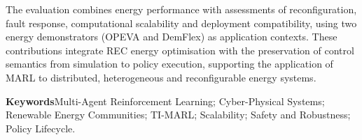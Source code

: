 The evaluation combines energy performance with assessments of reconfiguration, fault response, computational scalability and deployment compatibility, using two energy demonstrators (OPEVA and DemFlex) as application contexts. These contributions integrate REC energy optimisation with the preservation of control semantics from simulation to policy execution, supporting the application of MARL to distributed, heterogeneous and reconfigurable energy systems.

\vspace{3mm}
\noindent\textbf{Keywords}\quad Multi-Agent Reinforcement Learning; Cyber-Physical Systems; Renewable Energy Communities; TI-MARL; Scalability; Safety and Robustness; Policy Lifecycle.
